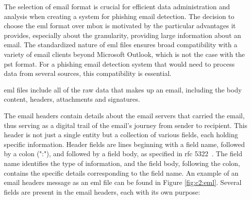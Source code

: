 The selection of email format is crucial for efficient data administration and analysis when creating a system for phishing email detection. The decision to choose the \ac{eml} format over \ac{mbox} is motivated by the particular advantages it provides, especially about the granularity, providing large information about an email. The standardized nature of \ac{eml} files ensures broad compatibility with a variety of email clients beyond Microsoft Outlook, which is not the case with the \ac{pst} format. For a phishing email detection system that would need to process data from several sources, this compatibility is essential.

\ac{eml} files include all of the raw data that makes up an email, including the body content, headers, attachments and signatures. 



The email headers contain details about the email servers that carried the email, thus serving as a digital trail of the email's journey from sender to recipient. This header is not just a single entity but a collection of various fields, each holding specific information.  Header fields are lines beginning with a field name, followed by a colon (":"), and followed by a field body, as specified in \ac{rfc} 5322~\cite{rfc5322}. The field name identifies the type of information, and the field body, following the colon, contains the specific details corresponding to the field name.
An example of an email headers message as an \ac{eml} file can be found in Figure \ref{fig:c2:eml}. Several fields are present in the email headers, each with its own purpose:

